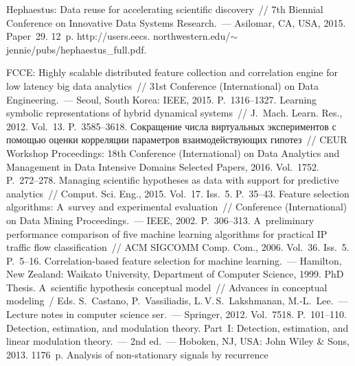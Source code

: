 \begin{multicols}{2}
{{\begin{thebibliography}{99}
   Hephaestus: Data reuse for accelerating scientific discovery~// 7th 
Biennial Conference on Innovative Data Systems Research.~--- Asilomar, CA, USA,
2015.  Paper~29. 12~p.
{\sf
http://users.eecs. northwestern.edu/$\sim$jennie/pubs/hephaestus\_full.pdf}.
  
   FCCE: Highly scalable 
distributed feature collection and correlation engine for low latency big data analytics~// 31st  
Conference (International) on Data Engineering.~---
Seoul, South Korea: IEEE, 2015. P.~1316--1327.
   Learning symbolic representations of hybrid dynamical systems~// 
J.~Mach. Learn. Res., 2012. Vol.~13. P.~3585--3618.
   Сокращение числа виртуальных экспериментов с помощью оценки 
корреляции параметров взаимодействующих гипотез~// CEUR Workshop Proceedings: 
18th  Conference (International) on Data Analytics and 
Management in Data Intensive Domains Selected Papers, 2016. Vol.~1752. P.~272--278.
   Managing scientific hypotheses as data with support for predictive 
analytics~// Comput. Sci. Eng., 2015. Vol.~17. Iss.~5. P.~35--43.
   Feature selection algorithms: 
  A~survey and experimental 
evaluation~// Conference (International)  on Data Mining Proceedings.~--- IEEE, 2002. 
P.~306--313.
   A~preliminary performance comparison of five 
machine learning algorithms for practical IP traffic flow classification~// ACM SIGCOMM 
Comp. Com., 2006. Vol.~36. Iss.~5. P.~5--16.
   Correlation-based feature selection for machine learning.~--- Hamilton, New 
Zealand: Waikato University, Department of Computer Science, 1999. PhD Thesis.
   A~scientific hypothesis 
conceptual model~// Advances in conceptual modeling~/
Eds. S.~Castano, P.~Vassiliadis, L.\,V.\,S.~Lakshmanan, M.-L.~Lee.~--- Lecture notes in computer 
science ser.~--- Springer, 2012. Vol.~7518. P.~101--110.
   Detection, estimation, and modulation theory. Part~I: Detection, estimation, and 
linear modulation theory.~--- 2nd ed.~--- Hoboken, NJ, USA: John Wiley \& Sons, 2013. 1176~p.
   Analysis of non-stationary signals by recurrence 

\end{thebibliography}}}
\end{multicols}
